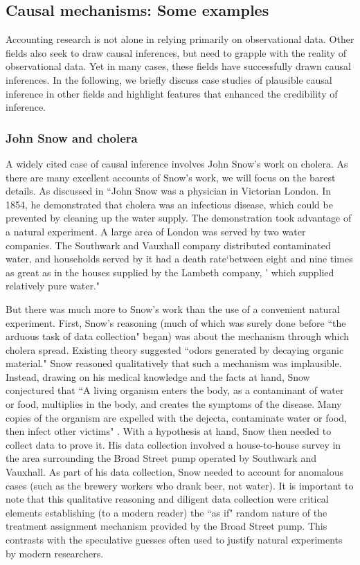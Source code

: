 \documentclass[11pt,reqno,titlepage]{amsart}
\begin{document}
\begin{doublespace}
\subsection{Causal mechanisms: Some examples}
Accounting research is not alone in relying primarily on observational data.
Other fields also seek to draw causal inferences, but need to grapple with the reality of observational data. 
Yet in many cases, these fields have successfully drawn causal inferences.
In the following, we briefly discuss case studies of plausible causal inference in other fields and highlight features that enhanced the credibility of inference.

\subsubsection{John Snow and cholera}
A widely cited case of causal inference involves John Snow's work on cholera.
As there are many excellent accounts of Snow's work, we will focus on the barest details.
As discussed in  \citet[p.\,339]{Freedman:2009ur}
``John Snow was a physician in Victorian London.
 In 1854, he demonstrated that cholera was an infectious disease, which could be prevented by cleaning up the water supply. 
The demonstration took advantage of a natural experiment.
 A large area of London was served by two water companies. 
 The Southwark and Vauxhall company distributed contaminated water, and households served by it had a death rate`between eight and nine times as great as in the houses supplied by the Lambeth company, ' which supplied relatively pure water."

But there was much more to Snow's work than the use of a convenient natural experiment.
First, Snow's reasoning (much of which was surely done before ``the arduous task of data collection" began) was about the  mechanism through which cholera spread. Existing theory suggested ``odors generated by decaying organic material."
Snow reasoned qualitatively that such a mechanism was implausible.
Instead, drawing on his medical knowledge and the facts at hand, Snow conjectured that ``A living organism enters the body, as a contaminant of water or food, multiplies in the body, and creates the symptoms of the disease. Many copies of the organism are expelled with the dejecta, contaminate water or food, then infect other victims" \citep[p.\,342]{Freedman:2009ur}.
With a hypothesis at hand, Snow then needed to collect data to prove it.
His data collection involved a house-to-house survey in the area surrounding the Broad Street pump operated by  Southwark and Vauxhall.
As part of his data collection, Snow needed to account for anomalous cases (such as the brewery workers who drank beer, not water).
It is important to note that this qualitative reasoning and diligent data collection were critical elements establishing (to a modern reader) the ``as if" random nature of the treatment assignment mechanism provided by the Broad Street pump.
This contrasts with the speculative guesses often used to justify natural experiments by modern researchers.


\end{doublespace}
\end{document}
